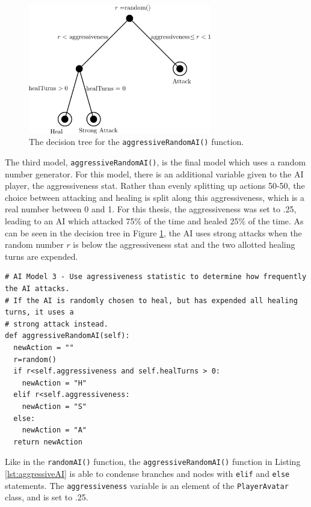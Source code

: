 \begin{figure}[H]
  \centering
  \includegraphics[width=8cm]{figures/AIAgressive.png}
  \caption{The decision tree for the \texttt{aggressiveRandomAI()} function.}
  \label{fig:AI3}
\end{figure}

The third model, \texttt{aggressiveRandomAI()}, is the final model which uses a random number generator. For this model, there is an additional variable given to the AI player, the aggressiveness stat. Rather than evenly splitting up actions 50-50, the choice between attacking and healing is split along this aggressiveness, which is a real number between 0 and 1. For this thesis, the aggressiveness was set to .25, leading to an AI which attacked 75\% of the time and healed 25\% of the time. As can be seen in the decision tree in Figure \ref{fig:AI3}, the AI uses strong attacks when the random number $r$ is below the aggressiveness stat and the two allotted healing turns are expended.

\begin{lstlisting}
# AI Model 3 - Use agressiveness statistic to determine how frequently the AI attacks.
# If the AI is randomly chosen to heal, but has expended all healing turns, it uses a
# strong attack instead.
def aggressiveRandomAI(self):
  newAction = ""
  r=random()
  if r<self.aggressiveness and self.healTurns > 0:
    newAction = "H"
  elif r<self.aggressiveness:
    newAction = "S"
  else:
    newAction = "A"
  return newAction
\end{lstlisting}

Like in the \texttt{randomAI()} function, the \texttt{aggressiveRandomAI()} function in Listing \ref{lst:aggressiveAI} is able to condense branches and nodes with \texttt{elif} and \texttt{else} statements. The \texttt{aggressiveness} variable is an element of the \texttt{PlayerAvatar} class, and is set to .25.


